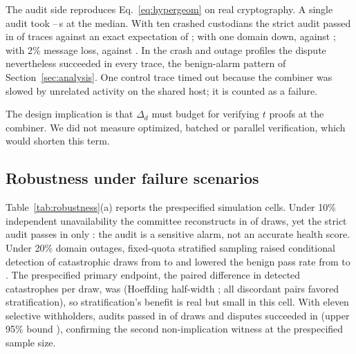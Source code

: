 \documentclass[10pt]{article}
\begin{document}
The audit side reproduces Eq.~\eqref{eq:hypergeom} on real cryptography. A single audit took \RDLAuditMedLo--\RDLAuditMedHi\,s at the median. With ten crashed custodians the strict audit passed in \RDLCrashTenAudit{} of traces against an exact expectation of \RExpCrashTen{}; with one domain down, \RDLDomainOutAudit{} against \RExpDomainOut{}; with 2\% message loss, \RDLLossAudit{} against \RExpLoss{}. In the crash and outage profiles the dispute nevertheless succeeded in every trace, the benign-alarm pattern of Section~\ref{sec:analysis}. One control trace timed out because the combiner was slowed by unrelated activity on the shared host; it is counted as a failure.

The design implication is that $\Delta_d$ must budget for verifying $t$ proofs at the combiner. We did not measure optimized, batched or parallel verification, which would shorten this term.

\subsection{Robustness under failure scenarios}

Table~\ref{tab:robustness}(a) reports the prespecified simulation cells. Under 10\% independent unavailability the committee reconstructs in \RIIDRecon{} of draws, yet the strict audit passes in only \RIIDAudit{}: the audit is a sensitive alarm, not an accurate health score. Under 20\% domain outages, fixed-quota stratified sampling raised conditional detection of catastrophic draws from \RStratDetU{} to \RStratDetS{} and lowered the benign pass rate from \RStratPassU{} to \RStratPassS{}. The prespecified primary endpoint, the paired difference in detected catastrophes per draw, was \RStratD{} (Hoeffding half-width \RStratHW{}; all \RStratDiscordant{} discordant pairs favored stratification), so stratification's benefit is real but small in this cell. With eleven selective withholders, audits passed in \RSWAudit{} of draws and disputes succeeded in \RSWDispute{} (upper 95\% bound \RSWDisputeHi{}), confirming the second non-implication witness at the prespecified sample size.

\begin{table}[!htbp]
\centering
\caption{Robustness under failure scenarios. (a)~Prespecified simulation; dispute success equals reconstructability because the simulator has no network. (b)~Emulated testbed: audit pass is $q=8$ valid responses within the 6\,s timeout; dispute success requires correct plaintext within $\Delta_d=2$\,s; times are over successful disputes, from first request to decrypted plaintext.}
\label{tab:robustness}
\small

\end{table}
\end{document}
